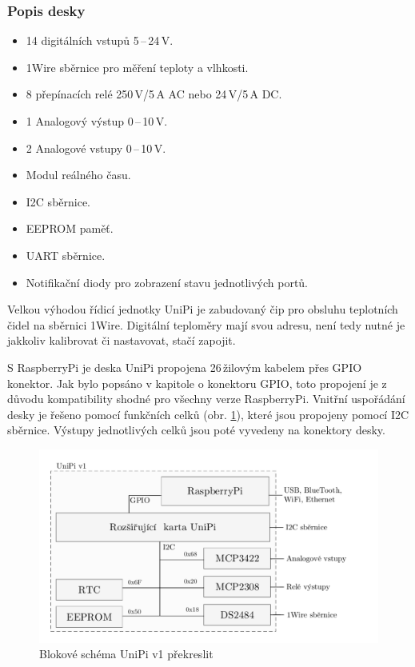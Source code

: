 \subsubsection{Popis desky}
\begin{itemize}
	\item 14 digitálních vstupů 5\,–\,24\,V. 
	\item 1Wire sběrnice pro měření teploty a vlhkosti. 
	\item 8 přepínacích relé 250\,V/5\,A AC nebo 24\,V/5\,A DC.
	\item 1 Analogový výstup 0\,–\,10\,V.
	\item 2 Analogové vstupy 0\,–\,10\,V.
	\item Modul reálného času.
	\item I2C sběrnice.
	\item EEPROM paměť.
	\item UART sběrnice.
	\item Notifikační diody pro zobrazení stavu jednotlivých portů.
\end{itemize}

Velkou výhodou řídicí jednotky UniPi je zabudovaný čip pro obsluhu teplotních čidel na sběrnici 1Wire. Digitální teploměry mají svou adresu, není tedy nutné je jakkoliv kalibrovat či nastavovat, stačí zapojit.

S RaspberryPi je deska UniPi propojena 26\,žilovým kabelem přes GPIO konektor. Jak bylo popsáno v kapitole o konektoru GPIO, toto propojení je z důvodu kompatibility shodné pro všechny verze RaspberryPi. Vnitřní uspořádání desky je řešeno pomocí funkčních celků  (obr. \ref{SchemaBlok1}), které jsou propojeny pomocí I2C sběrnice. Výstupy jednotlivých celků jsou poté vyvedeny na konektory desky.
 \begin{figure}[!h]
  \begin{center}
    \includegraphics[scale=0.7]{obrazky/unipi_schema1}
  \end{center}
  \caption{Blokové schéma UniPi v1 \colorbox[rgb]{0,1,0}{překreslit}}
	\label{SchemaBlok1}
\end{figure}

